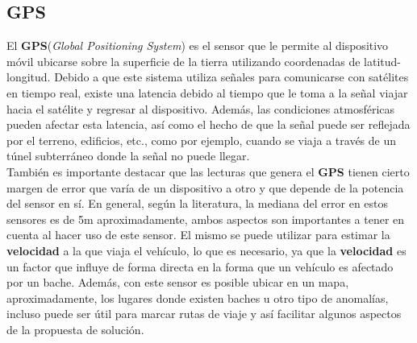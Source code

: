 	\subsection{GPS}
		El \textbf{GPS}(\emph{Global Positioning System}) es el sensor que le permite al dispositivo móvil ubicarse sobre la
		superficie de la tierra utilizando coordenadas de latitud-longitud. Debido a que este sistema utiliza señales para
		comunicarse con satélites en tiempo real, existe una latencia debido al tiempo que le toma a la señal viajar hacia el
		satélite y regresar al dispositivo. Además, las condiciones atmosféricas pueden afectar esta latencia, así como el hecho
		de que la señal puede ser reflejada por el terreno, edificios, etc., como por ejemplo, cuando se viaja a través de un
		túnel subterráneo donde la señal no puede llegar.\\
		\indent También es importante destacar que las lecturas que genera el \textbf {GPS} tienen cierto margen de error que varía
		de un dispositivo a otro y que depende de la potencia del sensor en sí. En general, según la literatura, la mediana del error
		en estos sensores es de 5m aproximadamente, ambos aspectos son importantes a tener en cuenta
		al hacer uso de este sensor. El mismo se puede utilizar para estimar la \textbf{velocidad} a la que viaja el vehículo, lo que
		es necesario, ya que la \textbf{velocidad} es un factor que influye de forma directa en la forma que un vehículo es afectado por
		un bache. Además, con este sensor es posible ubicar en un mapa, aproximadamente, los lugares donde existen baches u otro tipo
		de anomalías, incluso puede ser útil para marcar rutas de viaje y así facilitar algunos aspectos de la propuesta de solución.

